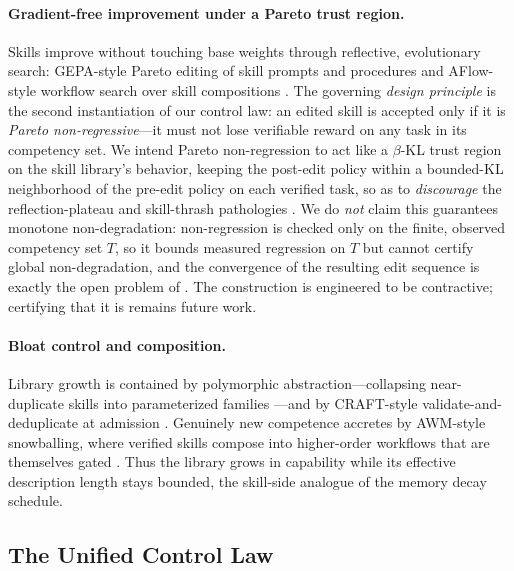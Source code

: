 \paragraph{Gradient-free improvement under a Pareto trust region.} Skills improve without touching base weights through reflective, evolutionary search: GEPA-style Pareto editing of skill prompts and procedures \citep{gepa2025} and AFlow-style workflow search over skill compositions \citep{aflow2024}. The governing \emph{design principle} is the second instantiation of our control law: an edited skill is accepted only if it is \emph{Pareto non-regressive}---it must not lose verifiable reward on any task in its competency set. We intend Pareto non-regression to act like a $\beta$-KL trust region on the skill library's behavior, keeping the post-edit policy within a bounded-KL neighborhood of the pre-edit policy on each verified task, so as to \emph{discourage} the reflection-plateau and skill-thrash pathologies \citep{reflexion2023,lats2023}. We do \emph{not} claim this guarantees monotone non-degradation: non-regression is checked only on the finite, observed competency set $T$, so it bounds measured regression on $T$ but cannot certify global non-degradation, and the convergence of the resulting edit sequence is exactly the open problem of . The construction is engineered to be contractive; certifying that it is remains future work.

\paragraph{Bloat control and composition.} Library growth is contained by polymorphic abstraction---collapsing near-duplicate skills into parameterized families \citep{polyskill2025}---and by CRAFT-style validate-and-deduplicate at admission \citep{craft2023}. Genuinely new competence accretes by AWM-style snowballing, where verified skills compose into higher-order workflows that are themselves gated \citep{awm2024}. Thus the library grows in capability while its effective description length stays bounded, the skill-side analogue of the memory decay schedule.

\subsection{The Unified Control Law}
\label{subsec:control}

